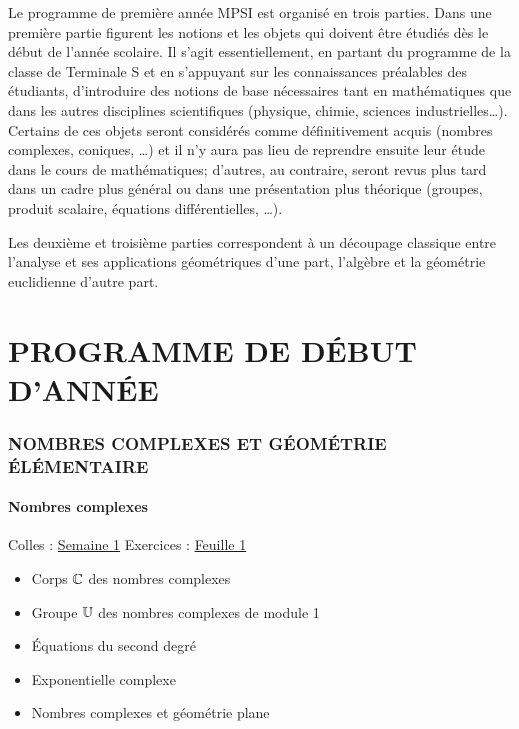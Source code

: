 



  Le programme de premi\`ere ann\'ee MPSI est organis\'e en
trois parties. Dans une premi\`ere partie figurent les notions et
les objets qui doivent \^etre \'etudi\'es d\`es le d\'ebut de
l'ann\'ee scolaire. Il s'agit essentiellement, en partant du
programme de la classe de Terminale S et en s'appuyant sur les
connaissances pr\'ealables des \'etudiants, d'introduire des
notions de base n{\'e}cessaires tant en math{\'e}matiques que dans
les autres disciplines scientifiques (physique, chimie, sciences
industrielles\dots). Certains de ces objets seront consid\'er\'es
comme d\'efinitivement acquis (nombres complexes, coniques, \dots)
et il n'y aura pas lieu de reprendre ensuite leur \'etude dans le
cours de math\'ematiques; d'autres, au contraire, seront revus
plus tard dans un cadre plus g\'en\'eral ou dans une
pr\'esentation plus th\'eorique (groupes, produit scalaire,
\'equations diff\'erentielles, \dots).

Les deuxi\`eme et troisi\`eme parties correspondent \`a un
d\'ecoupage classique entre l'analyse et ses applications
g\'eom\'etriques d'une part, l'alg\`ebre et la g\'eom\'etrie
euclidienne d'autre part.  \vfill\eject

\part{PROGRAMME DE D\'EBUT D'ANN\'EE}\label{part-debann}

\section{NOMBRES COMPLEXES ET G\'EOM\'ETRIE
\'EL\'EMENTAIRE}\label{nbcomp}


\subsection{Nombres complexes}
Colles : \href{S1.pdf}{Semaine 1}\newline
 Exercices : \href{../Exercices/NExo/nexo1.pdf}{Feuille 1}
\begin{itemize}
  \item Corps $\Bbb{C}$ des nombres complexes

\item Groupe $\Bbb{U}$ des nombres complexes de module 1

\item \'Equations du second degr\'e

\item Exponentielle complexe

\item Nombres complexes et g\'eom\'etrie plane
\end{itemize}

